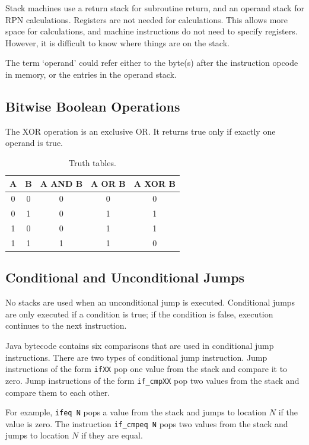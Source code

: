 Stack machines use a return stack for subroutine return, and an operand stack for RPN calculations.
Registers are not needed for calculations.
This allows more space for calculations, and machine instructions do not need to specify registers.
However, it is difficult to know where things are on the stack.

The term `operand' could refer either to the byte(s) after the instruction opcode in memory, or the entries in the operand stack.

\subsection{Bitwise Boolean Operations}

The XOR operation is an exclusive OR\@.
It returns true only if exactly one operand is true.

\begin{table}[htp]
  \centering
  \caption*{Truth tables.}
  \begin{tabular}{ccccc}
    \toprule
    A & B & A AND B & A OR B & A XOR B \\
    \midrule
    0 & 0 & 0 & 0 & 0 \\
    0 & 1 & 0 & 1 & 1 \\
    1 & 0 & 0 & 1 & 1 \\
    1 & 1 & 1 & 1 & 0 \\
    \bottomrule
  \end{tabular}
\end{table}

\subsection{Conditional and Unconditional Jumps}

No stacks are used when an unconditional jump is executed.
Conditional jumps are only executed if a condition is true; if the condition is false, execution continues to the next instruction.

Java bytecode contains six comparisons that are used in conditional jump instructions.
There are two types of conditional jump instruction.
Jump instructions of the form \texttt{ifXX} pop one value from the stack and compare it to zero.
Jump instructions of the form \texttt{if\_cmpXX} pop two values from the stack and compare them to each other.

For example, \texttt{ifeq N} pops a value from the stack and jumps to location \( N \) if the value is zero.
The instruction \texttt{if\_cmpeq N} pops two values from the stack and jumps to location \( N \) if they are equal.

